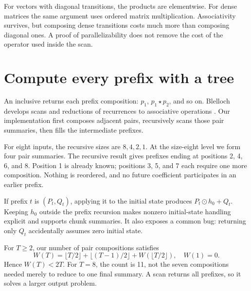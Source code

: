 For vectors with diagonal transitions, the products are elementwise.
For dense matrices the same argument uses ordered matrix multiplication.
Associativity survives, but composing dense transitions costs much more
than composing diagonal ones. A proof of parallelizability does not
remove the cost of the operator used inside the scan.

\section{Compute every prefix with a tree}

An inclusive  returns each prefix composition:
$p_1$, $p_1\star p_2$, and so on. Blelloch develops scans and reductions
of recurrences to associative operations \cite{blelloch}.
Our implementation first composes adjacent pairs, recursively scans those
pair summaries, then fills the intermediate prefixes.

For eight inputs, the recursive sizes are $8,4,2,1$. At the size-eight
level we form four pair summaries. The recursive result gives prefixes
ending at positions 2, 4, 6, and 8. Position 1 is already known;
positions 3, 5, and 7 each require one more composition. Nothing is
reordered, and no future coefficient participates in an earlier prefix.



If prefix $t$ is $(P_t,Q_t)$, applying it to the initial state produces
$P_t\odot h_0+Q_t$. Keeping $h_0$ outside the prefix recursion makes
nonzero initial-state handling explicit and supports chunk summaries.
It also exposes a common bug: returning only $Q_t$ accidentally assumes
zero initial state.

For $T\geq2$, our number of pair compositions satisfies
\begin{equation}
 W(T)=\lfloor T/2\rfloor+
      \lfloor(T-1)/2\rfloor+W(\lfloor T/2\rfloor),\quad W(1)=0.
\end{equation}
Hence $W(T)<2T$. For $T=8$, the count is 11, not the seven
compositions needed merely to reduce to one final summary. A scan
returns all prefixes, so it solves a larger output problem.

